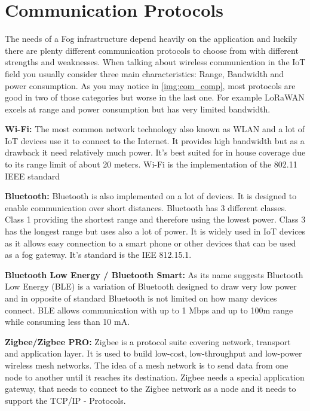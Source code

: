 \section{Communication Protocols}\label{sec:comm}



The needs of a Fog infrastructure depend heavily on the application and luckily there are plenty different communication protocols to choose from with different strengths and weaknesses. When talking about wireless communication in the IoT field you usually consider three main characteristics: Range, Bandwidth and power consumption. As you may notice in \autoref{img:com_comp}, most protocols are good in two of those categories but worse in the last one. For example LoRaWAN excels at range and power consumption but has very limited bandwidth.


\textbf{Wi-Fi:} The most common network technology also known as WLAN and a lot of IoT devices use it to connect to the Internet. It provides high bandwidth but as a drawback it need relatively much power. It's best suited for in house coverage due to its range limit of about 20 meters. Wi-Fi is the implementation of the 802.11 IEEE standard\cite{Perera:2017:FCS:3101309.3057266}

\textbf{Bluetooth:} Bluetooth is also implemented on a lot of devices. It is designed to enable communication over short distances. Bluetooth has 3 different classes. Class 1 providing the shortest range and therefore using the lowest power. Class 3 has the longest range but uses also a lot of power. It is widely used in IoT devices as it allows easy connection to a smart phone or other devices that can be used as a fog gateway. It's standard is the IEE 812.15.1.\cite{Perera:2017:FCS:3101309.3057266}

\textbf{Bluetooth Low Energy / Bluetooth Smart:} As its name suggests Bluetooth Low Energy (BLE) is a variation of Bluetooth designed to draw very low power and in opposite of standard Bluetooth is not limited on how many devices connect. BLE allows communication with up to 1 Mbps and up to 100m range while consuming less than 10 mA.\cite{Perera:2017:FCS:3101309.3057266}

\textbf{Zigbee/Zigbee PRO:} Zigbee is a protocol suite covering network, transport and application layer. It is used to build low-cost, low-throughput and low-power wireless mesh networks. The idea of a mesh network is to send data from one node to another until it reaches its destination. Zigbee needs a special application gateway, that needs to connect to the Zigbee network as a node and it needs to support the TCP/IP - Protocols.\cite{Perera:2017:FCS:3101309.3057266}

